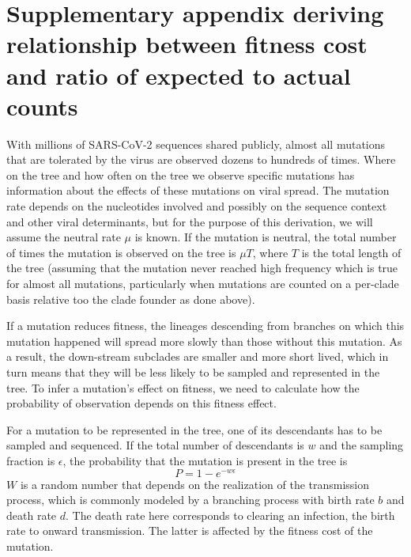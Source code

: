 \documentclass[9pt,twocolumn,twoside]{gsajnl_modified}
\begin{document}
\onecolumn
\renewcommand{\thepage}{S\arabic{page}}
\setcounter{page}{1}
\renewcommand{\thefigure}{S\arabic{figure}}
\setcounter{figure}{0}

\clearpage

\section{Supplementary appendix deriving relationship between fitness cost and ratio of expected to actual counts}

With millions of SARS-CoV-2 sequences shared publicly, almost all mutations that are tolerated by the virus are observed dozens to hundreds of times.
Where on the tree and how often on the tree we observe specific mutations has information about the effects of these mutations on viral spread.
The mutation rate depends on the nucleotides involved and possibly on the sequence context and other viral determinants, but for the purpose of this derivation, we will assume the neutral rate $\mu$ is known.
If the mutation is neutral, the total number of times the mutation is observed on the tree is $\mu T$, where $T$ is the total length of the tree (assuming that the mutation never reached high frequency which is true for almost all mutations, particularly when mutations are counted on a per-clade basis relative too the clade founder as done above).

If a mutation reduces fitness, the lineages descending from branches on which this mutation happened will spread more slowly than those without this mutation.
As a result, the down-stream subclades are smaller and more short lived, which in turn means that they will be less likely to be sampled and represented in the tree.
To infer a mutation's effect on fitness, we need to calculate how the probability of observation depends on this fitness effect.

For a mutation to be represented in the tree, one of its descendants has to be sampled and sequenced.
If the total number of descendants is $w$ and the sampling fraction is $\epsilon$, the probability that the mutation is present in the tree is
\begin{equation}
    P = 1 - e^{-w\epsilon}
\end{equation}
$W$ is a random number that depends on the realization of the transmission process, which is commonly modeled by a branching process with birth rate $b$ and death rate $d$.
The death rate here corresponds to clearing an infection, the birth rate to onward transmission. The latter is affected by the fitness cost of the mutation.
\end{document}
